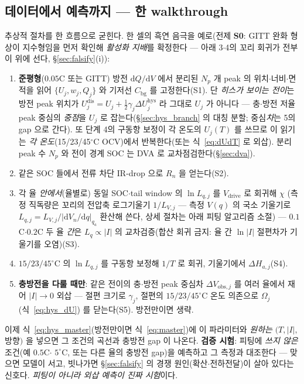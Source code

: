 \documentclass[11pt,a4paper]{article}
\newcommand{\dd}{\mathrm{d}}
\newcommand{\drive}{\mathrm{drive}}
\newcommand{\bg}{\mathrm{bg}}
\newcommand{\dis}{\mathrm{dis}}
\newcommand{\hys}{\mathrm{hys}}
\begin{document}
\subsection{데이터에서 예측까지 — 한 walkthrough}
추상적 절차를 한 흐름으로 굳힌다. 한 셀의 흑연 음극을 예로(전제 \textbf{S0}: GITT 완화 형상이 지수형임을 먼저
확인해 \emph{활성화 지배}를 확정한다 — 아래 3$\cdot$4의 꼬리 회귀가 전부 이 위에 선다, \S\ref{sec:falsify}(i)):
\begin{enumerate}[label=\textbf{\arabic*.},leftmargin=2.0em,itemsep=1pt]
\item \textbf{준평형}($0.05$C 또는 GITT) 방전 $\dd Q/\dd V$ 에서 분리된 $N_p$ 개 peak 의 위치$\cdot$너비$\cdot$면적을
  읽어 $\{U_j,w_j,Q_j\}$ 와 기저선 $C_\bg$ 를 고정한다(S1). 단 \emph{히스가 보이는 전이}는 방전 peak 위치가
  $U_j^{\dis}=U_j+\tfrac12\gamma_j\Delta U_j^\hys$ 라 그대로 $U_j$ 가 아니다 — 충$\cdot$방전 저율 peak 중심의
  \emph{중점}을 $U_j$ 로 잡는다(\S\ref{sec:hys_branch} 의 대칭 분할; 중심\emph{차}는 5의 gap 으로 간다). 또 단계
  4의 구동항 보정이 각 온도의 $U_j(T)$ 를 쓰므로 이 읽기는 \emph{각 온도}(15/23/45$^\circ$C OCV)에서 반복한다(또는
  식~\eqref{eq:dUdT} 로 외삽). 분리 peak 수 $N_p$ 와 전이 경계 SOC 는 DVA 로 교차점검한다(\S\ref{sec:dva}).
\item 같은 SOC 들에서 전류 차단 IR-drop 으로 $R_n$ 을 얻는다(S2).
\item 각 율 \emph{안에서}(율별로) 동일 SOC$\cdot$tail window 의 $\ln L_{q,j}$ 를 $V_\drive$ 로 회귀해 $\chi$
  (측정 직독량은 꼬리의 전압축 로그기울기 $1/L_{V,j}$ — 측정 $V(q)$ 의 국소 기울기로
  $L_{q,j}=L_{V,j}/|\dd V_n/\dd q|_{q_a}$ 환산해 쓴다, 상세 절차는 아래 피팅 알고리즘 소절) —
  $0.1$C$\cdot$$0.2$C 두 율 \emph{간}은 $L_q\propto|I|$ 의 교차검증(합산 회귀 금지: 율 간 $\ln|I|$ 절편차가 기울기를
  오염)(S3).
\item $15/23/45^\circ$C 의 $\ln L_{q,j}$ 를 구동항 보정해 $1/T$ 로 회귀, 기울기에서 $\Delta H_{a,j}$(S4).
\item \textbf{충방전을 다룰 때만}: 같은 전이의 충$\cdot$방전 peak 중심차 $\Delta V_{\mathrm{obs},j}$ 를 여러 율에서 재어
  $|I|\to0$ 외삽 — 절편 크기로 $\gamma_j$, 절편의 $15/23/45^\circ$C 온도 의존으로 $\Omega_j$(식~\eqref{eq:hys_dU})
  를 닫는다(S5). 방전만이면 생략.
\end{enumerate}
이제 식~\eqref{eq:hys_master}(방전만이면 식~\eqref{eq:master})에 이 파라미터와 \emph{원하는} $(T,|I|,$ 방향$)$ 을
넣으면 그 조건의 곡선과 충방전 gap 이 나온다. \textbf{검증 시험}: 피팅에 \emph{쓰지 않은} 조건(예 $0.5$C$\cdot$
$5^\circ$C, 또는 다른 율의 충방전 gap)을 예측하고 그 측정과 대조한다 — 맞으면 모델이 서고, 빗나가면
\S\ref{sec:falsify} 의 경쟁 원인(확산$\cdot$전하전달)이 살아 있다는 신호다. \emph{피팅이 아니라 외삽 예측이 진짜 시험}이다.
\end{document}
